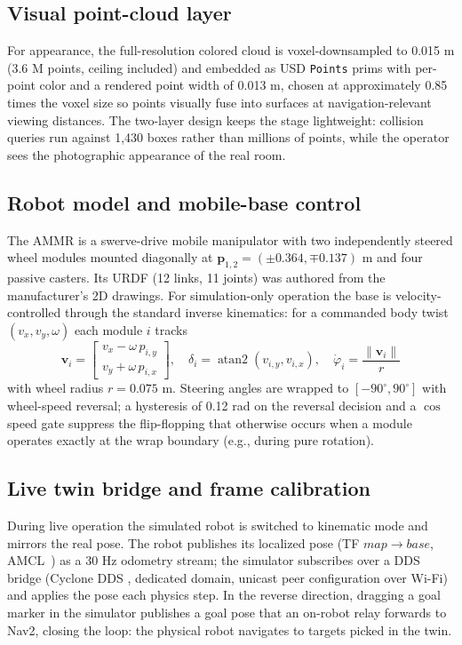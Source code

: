 \documentclass[conference]{IEEEtran}
\begin{document}
\subsection{Visual point-cloud layer}
\label{sec:vislayer}
For appearance, the full-resolution colored cloud is voxel-downsampled
to 0.015 m (3.6 M points, ceiling included) and embedded as USD
\texttt{Points} prims with per-point color and a rendered point width
of 0.013 m, chosen at approximately 0.85 times the voxel size so points
visually fuse into surfaces at navigation-relevant viewing distances.
The two-layer design keeps the stage lightweight: collision queries
run against 1{,}430 boxes rather than millions of points, while the
operator sees the photographic appearance of the real room.

\subsection{Robot model and mobile-base control}
\label{sec:robot}
The AMMR is a swerve-drive mobile manipulator with two independently
steered wheel modules mounted diagonally at $\mathbf{p}_{1,2}=
(\pm0.364, \mp0.137)$ m and four passive casters. Its URDF (12 links,
11 joints) was authored from the manufacturer's 2D drawings. For
simulation-only operation the base is velocity-controlled through the
standard inverse kinematics: for a commanded body twist
$(v_x, v_y, \omega)$ each module $i$ tracks
\begin{equation}
\mathbf{v}_i = \begin{bmatrix} v_x - \omega\, p_{i,y} \\
v_y + \omega\, p_{i,x} \end{bmatrix},\quad
\delta_i = \operatorname{atan2}(v_{i,y}, v_{i,x}),\quad
\dot\varphi_i = \frac{\lVert \mathbf{v}_i \rVert}{r}
\label{eq:swerve}
\end{equation}
with wheel radius $r=0.075$ m. Steering angles are wrapped to
$[-90^\circ, 90^\circ]$ with wheel-speed reversal; a hysteresis of
0.12 rad on the reversal decision and a $\cos$ speed gate suppress the
flip-flopping that otherwise occurs when a module operates exactly at
the wrap boundary (e.g., during pure rotation).

\subsection{Live twin bridge and frame calibration}
\label{sec:bridge}
During live operation the simulated robot is switched to kinematic
mode and mirrors the real pose. The robot publishes its localized pose
(TF $map\rightarrow base$, AMCL~\cite{dellaert1999}) as a 30 Hz odometry stream; the
simulator subscribes over a DDS bridge (Cyclone DDS \cite{cyclonedds},
dedicated domain, unicast peer configuration over Wi-Fi) and applies
the pose each physics step. In the reverse direction, dragging a goal
marker in the simulator publishes a goal pose that an on-robot relay
forwards to Nav2, closing the loop: the physical robot navigates to
targets picked in the twin.
\end{document}
